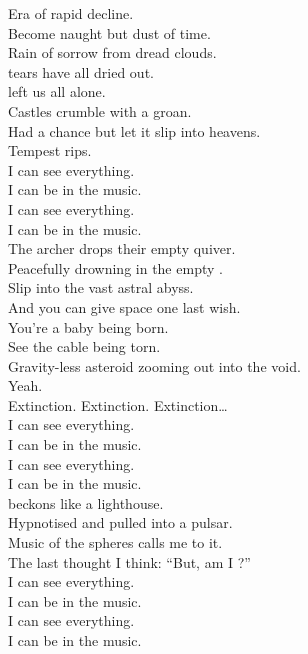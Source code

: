 Era of rapid decline. \\
Become naught but dust of time. \\
Rain of sorrow from dread clouds. \\
 tears have all dried out. \\
 left us all alone. \\
Castles crumble with a groan. \\
Had a chance but let it slip into heavens. \\
Tempest rips. \\

I can see everything. \\
I can be in the music. \\
I can see everything. \\
I can be in the music. \\

The archer drops their empty quiver. \\
Peacefully drowning in the empty . \\
Slip into the vast astral abyss. \\
And you can give space one last wish. \\

You're a baby being born. \\
See the cable being torn. \\
Gravity-less asteroid zooming out into the void. \\
Yeah. \\

Extinction. Extinction. Extinction… \\

I can see everything. \\
I can be in the music. \\
I can see everything. \\
I can be in the music. \\

 beckons like a lighthouse. \\
Hypnotised and pulled into a pulsar. \\
Music of the spheres calls me to it. \\
The last thought I think: ``But, am I ?'' \\

I can see everything. \\
I can be in the music. \\
I can see everything. \\
I can be in the music. \\

